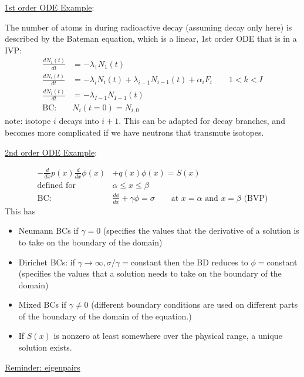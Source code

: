 \documentclass[12pt]{article}
\begin{document}
\vspace*{1em}
\noindent \underline{1st order ODE Example}:

The number of atoms in during radioactive decay (assuming decay only here) is described by the Bateman equation, which is a linear, 1st order ODE that is in a IVP:
%
\begin{align}
\frac{dN_1(t)}{dt} &= -\lambda_1 N_1(t) \nonumber \\
\frac{dN_i(t)}{dt} &= -\lambda_i N_i(t) + \lambda_{i-1}N_{i-1}(t) + \alpha_i F_i \qquad 1 < k < I \nonumber\\
\frac{dN_I(t)}{dt} &= -\lambda_{I-1} N_{I-1}(t) \nonumber \\
\text{BC: }& N_i(t=0) = N_{i,0}\nonumber
\end{align}
%
note: isotope $i$ decays into $i+1$. This can be adapted for decay branches, and becomes more complicated if we have neutrons that transmute isotopes. 

\vspace*{1em}
\noindent \underline{2nd order ODE Example}:

\begin{align}
-\frac{d}{dx}p(x) \frac{d}{dx}\phi(x) &+ q(x)\phi(x) = S(x) \nonumber \\
\text{defined for }& \alpha \le x \le \beta \nonumber \\
\text{BC: }& \frac{d\phi}{dx} + \gamma \phi = \sigma \qquad \text{at } x=\alpha \text{ and } x = \beta \text{ (BVP)}\nonumber
\end{align}
%
This has
\begin{itemize}
\item Neumann BCs if $\gamma = 0$ (specifies the values that the derivative of a solution is to take on the boundary of the domain)
\item Dirichet BCs: if $\gamma \rightarrow \infty, \sigma / \gamma = $constant then the BD reduces to $\phi = $constant (specifies the values that a solution needs to take on the boundary of the domain)
\item Mixed BCs if $\gamma \ne 0$ (different boundary conditions are used on different parts of the boundary of the domain of the equation.)
\item If $S(x)$ is nonzero at least somewhere over the physical range, a unique solution exists.
\end{itemize}

\vspace*{1 em} \underline{Reminder: eigenpairs}
\end{document}

